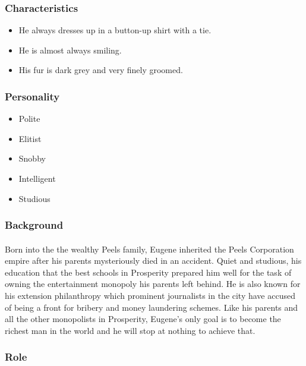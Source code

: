 \subsubsection{Characteristics}

\begin{itemize}
    \item He always dresses up in a button-up shirt with a tie.
    \item He is almost always smiling.
    \item His fur is dark grey and very finely groomed.
\end{itemize}

\subsubsection{Personality}

\begin{itemize}
    \item Polite
    \item Elitist
    \item Snobby
    \item Intelligent
    \item Studious
\end{itemize}

\subsubsection{Background}

\paragraph{} Born into the the wealthy Peels family, Eugene inherited the Peels Corporation empire after his parents mysteriously died in an accident. Quiet and studious, his education that the best schools in Prosperity prepared him well for the task of owning the entertainment monopoly his parents left behind. He is also known for his extension philanthropy which prominent journalists in the city have accused of being a front for bribery and money laundering schemes. Like his parents and all the other monopolists in Prosperity, Eugene's only goal is to become the richest man in the world and he will stop at nothing to achieve that.

\subsubsection{Role}

